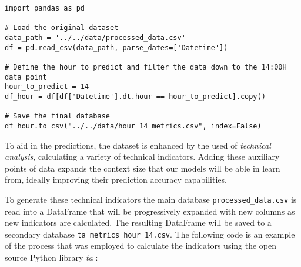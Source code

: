 \documentclass[12pt]{report} %
\begin{document}
\begin{lstlisting}
import pandas as pd

# Load the original dataset
data_path = '../../data/processed_data.csv'
df = pd.read_csv(data_path, parse_dates=['Datetime'])

# Define the hour to predict and filter the data down to the 14:00H data point
hour_to_predict = 14
df_hour = df[df['Datetime'].dt.hour == hour_to_predict].copy()

# Save the final database
df_hour.to_csv("../../data/hour_14_metrics.csv", index=False)
\end{lstlisting}

To aid in the predictions, the dataset is enhanced by the used of \textit{technical analysis}, calculating a variety of technical indicators. Adding these auxiliary points of data expands the context size that our models will be able in learn from, ideally improving their prediction accuracy capabilities.

To generate these technical indicators the main database \small{\verb|processed_data.csv|} is read into a DataFrame that will be progressively expanded with new columns as new indicators are calculated. The resulting DataFrame will be saved to a secondary database \small{\verb|ta_metrics_hour_14.csv|}. The following code is an example of the process that was employed to calculate the indicators using the open source Python library \textit{ta} \cite{ta-lib}:
\end{document}
